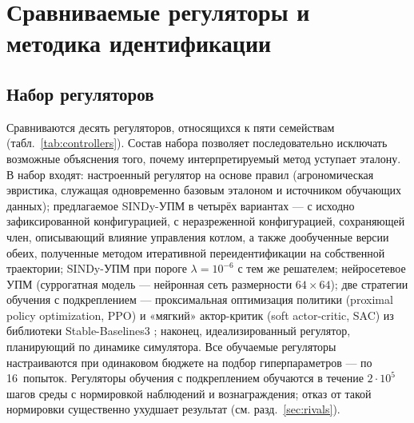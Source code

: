\documentclass[12pt,a4paper,leqno]{article}
\begin{document}
\section{Сравниваемые регуляторы и методика идентификации}
\label{sec:methods}

\subsection{Набор регуляторов}
Сравниваются десять регуляторов, относящихся к пяти семействам
(табл.~\ref{tab:controllers}). Состав набора позволяет последовательно исключать
возможные объяснения того, почему интерпретируемый метод уступает эталону. В набор входят:
настроенный регулятор на основе правил (агрономическая эвристика, служащая одновременно
базовым эталоном и источником обучающих данных); предлагаемое SINDy-УПМ в четырёх
вариантах — с исходно зафиксированной конфигурацией, с неразреженной конфигурацией,
сохраняющей член, описывающий влияние управления котлом, а также дообученные версии обеих, полученные методом итеративной переидентификации на собственной траектории; SINDy-УПМ при пороге
$\lambda=10^{-6}$ с тем же решателем; нейросетевое УПМ
(суррогатная модель — нейронная сеть размерности $64{\times}64$); две стратегии
обучения с подкреплением — проксимальная оптимизация политики (proximal policy
optimization, PPO) \cite{schulman2017} и «мягкий» актор-критик (soft actor-critic, SAC)
\cite{haarnoja2018} из библиотеки Stable-Baselines3 \cite{raffin2021}; наконец,
идеализированный регулятор, планирующий по динамике симулятора. Все обучаемые
регуляторы настраиваются при одинаковом бюджете на подбор гиперпараметров — по
16~попыток. Регуляторы обучения с подкреплением обучаются в течение $2\cdot10^{5}$
шагов среды с нормировкой наблюдений и вознаграждения; отказ от такой нормировки
существенно ухудшает результат (см. разд.~\ref{sec:rivals}).
\end{document}
